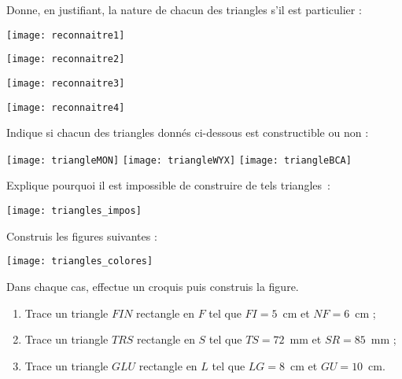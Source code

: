 \begin{exercice}[Reconnaître]
Donne, en justifiant, la nature de chacun des triangles s'il est particulier :
\begin{colenumerate}{4}
 \item 
 
 \texttt{[image: reconnaitre1]}
 \item 
 
 \texttt{[image: reconnaitre2]}
 \item 
 
 \texttt{[image: reconnaitre3]}
 \item 
 
 \texttt{[image: reconnaitre4]}
 \end{colenumerate}
\end{exercice}



\begin{exercice}
Indique si chacun des triangles donnés ci-dessous est constructible ou non :

\texttt{[image: triangleMON]} \hfill \texttt{[image: triangleWYX]} \hfill \texttt{[image: triangleBCA]}
\end{exercice}


\begin{exercice}
Explique pourquoi il est impossible de construire de tels triangles :

\hfill \texttt{[image: triangles\_impos]} \hfill 
\end{exercice}


\begin{exercice}
Construis les figures suivantes :

\hfill \texttt{[image: triangles\_colores]} \hfill 
\end{exercice}


\begin{exercice}
Dans chaque cas, effectue un croquis puis construis la figure.

 \begin{enumerate}
  \item Trace un triangle $FIN$ rectangle en $F$ tel que $FI = 5$ cm et $NF = 6$ cm ;
  \item Trace un triangle $TRS$ rectangle en $S$ tel que $TS = 72$ mm et $SR = 85$ mm ;
  \item Trace un triangle $GLU$ rectangle en $L$ tel que $LG = 8$ cm et $GU = 10$ cm.
  \end{enumerate}
\end{exercice}


